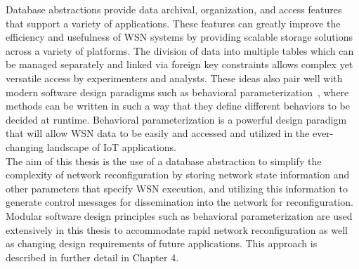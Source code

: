 Database abstractions provide data archival, organization, and access features that support a variety of applications. These features can greatly improve the efficiency and usefulness of WSN systems by providing scalable storage solutions across a variety of platforms. The division of data into multiple tables which can be managed separately and linked via foreign key constraints allows complex yet versatile access by experimenters and analysts. These ideas also pair well with modern software design paradigms such as behavioral parameterization~\cite{urma2014java}, where methods can be written in such a way that they define different behaviors to be decided at runtime. Behavioral parameterization is a powerful design paradigm that will allow WSN data to be easily and accessed and utilized in the ever-changing landscape of IoT applications.\\  

The aim of this thesis is the use of a database abstraction to simplify the complexity of network reconfiguration by storing network state information and other parameters that specify WSN execution, and utilizing this information to generate control messages for dissemination into the network for reconfiguration. Modular software design principles such as behavioral parameterization are used extensively in this thesis to accommodate rapid network reconfiguration as well as changing design requirements of future applications. This approach is described in further detail in Chapter 4.